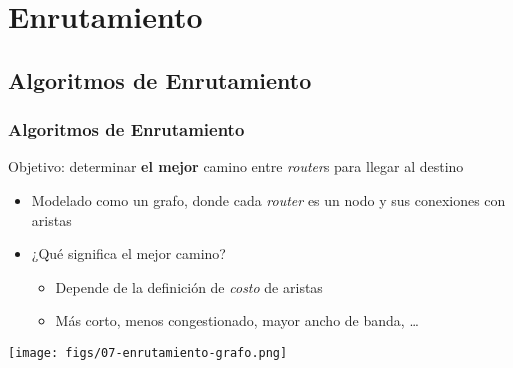 \documentclass[letter]{beamer}
\begin{document}
\section{Enrutamiento}

\subsection{Algoritmos de Enrutamiento}

\begin{frame}
  \frametitle{Algoritmos de Enrutamiento}

  Objetivo: determinar {\bf el mejor} camino entre {\em router}s para llegar al destino
  \begin{itemize}
    \item Modelado como un grafo, donde cada {\em router} es un nodo y sus conexiones con aristas
    \item ¿Qué significa el mejor camino?
      \begin{itemize}
        \item Depende de la definición de {\em costo} de aristas
        \item Más corto, menos congestionado, mayor ancho de banda, \ldots
      \end{itemize}
  \end{itemize}

  \begin{center}
    \texttt{[image: figs/07-enrutamiento-grafo.png]}
  \end{center}

\end{frame}
\end{document}

